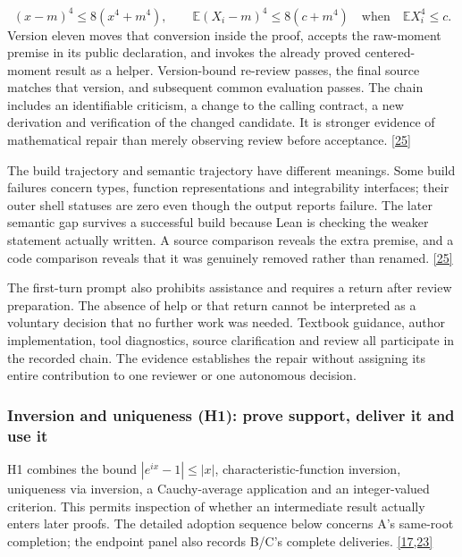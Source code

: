 \[
(x-m)^4\leq8(x^4+m^4),\qquad
\mathbb E(X_i-m)^4\leq8(c+m^4)
\quad\text{when}\quad\mathbb E X_i^4\leq c.
\]
Version eleven moves that conversion inside the proof, accepts the raw-moment premise in its public declaration, and invokes the already proved centered-moment result as a helper. Version-bound re-review passes, the final source matches that version, and subsequent common evaluation passes. The chain includes an identifiable criticism, a change to the calling contract, a new derivation and verification of the changed candidate. It is stronger evidence of mathematical repair than merely observing review before acceptance. \href{en.pdf\#ref-25}{\mbox{[25]}}

The build trajectory and semantic trajectory have different meanings. Some build failures concern types, function representations and integrability interfaces; their outer shell statuses are zero even though the output reports failure. The later semantic gap survives a successful build because Lean is checking the weaker statement actually written. A source comparison reveals the extra premise, and a code comparison reveals that it was genuinely removed rather than renamed. \href{en.pdf\#ref-25}{\mbox{[25]}}

The first-turn prompt also prohibits assistance and requires a return after review preparation. The absence of help or that return cannot be interpreted as a voluntary decision that no further work was needed. Textbook guidance, author implementation, tool diagnostics, source clarification and review all participate in the recorded chain. The evidence establishes the repair without assigning its entire contribution to one reviewer or one autonomous decision.

\subsubsection[Inversion and uniqueness (H1): prove support, deliver it and use it]{\texorpdfstring{\protect\hypertarget{r2-3}{}Inversion and uniqueness (H1): prove support, deliver it and use it}{Inversion and uniqueness (H1): prove support, deliver it and use it}}
H1 combines the bound $|e^{ix}-1|\leq|x|$, characteristic-function inversion, uniqueness via inversion, a Cauchy-average application and an integer-valued criterion. This permits inspection of whether an intermediate result actually enters later proofs. The detailed adoption sequence below concerns A's same-root completion; the endpoint panel also records B/C's complete deliveries. \href{en.pdf\#ref-17}{\mbox{[17,23]}}


